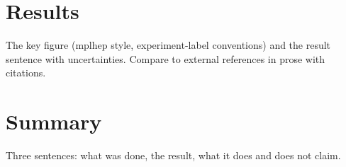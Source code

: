 \documentclass[11pt]{article}
\begin{document}
\section{Results}
The key figure (mplhep style, experiment-label conventions) and the result sentence
with \stat\syst uncertainties. Compare to external references in prose with citations.

\section{Summary}
Three sentences: what was done, the result, what it does and does not claim.



\end{document}
